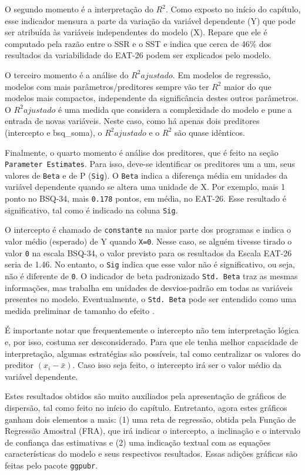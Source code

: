 \documentclass[
]{book}
\begin{document}
O segundo momento é a interpretação do \(R^2\). Como exposto no início do capítulo, esse indicador mensura a parte da variação da variável dependente (Y) que pode ser atribuída às variáveis independentes do modelo (X). Repare que ele é computado pela razão entre o SSR e o SST e indica que cerca de 46\% dos resultados da variabilidade do EAT-26 podem ser explicados pelo modelo.

O terceiro momento é a análise do \(R^2 ajustado\). Em modelos de regressão, modelos com mais parâmetros/preditores sempre vão ter \(R^2\) maior do que modelos mais compactos, independente da significância destes outros parâmetros. O \(R^2 ajustado\) é uma medida que considera a complexidade do modelo e pune a entrada de novas variáveis. Neste caso, como há apenas dois preditores (intercepto e bsq\_soma), o \(R^2 ajustado\) e o \(R^2\) são quase idênticos.

Finalmente, o quarto momento é análise dos preditores, que é feito na seção \texttt{Parameter\ Estimates}. Para isso, deve-se identificar os preditores um a um, seus valores de \texttt{Beta} e de P (\texttt{Sig}). O \texttt{Beta} indica a diferença média em unidades da variável dependente quando se altera uma unidade de X. Por exemplo, mais 1 ponto no BSQ-34, mais \texttt{0.178} pontos, em média, no EAT-26. Esse resultado é significativo, tal como é indicado na coluna \texttt{Sig}.

O intercepto é chamado de \texttt{constante} na maior parte dos programas e indica o valor médio (esperado) de Y quando \texttt{X=0}. Nesse caso, se alguém tivesse tirado o valor \texttt{0} na escala BSQ-34, o valor previsto para os resultados da Escala EAT-26 seria de 1.46. No entanto, o \texttt{Sig} indica que esse valor não é significativo, ou seja, não é diferente de \texttt{0}. O indicador de beta padronizado \texttt{Std.\ Beta} traz as mesmas informações, mas trabalha em unidades de desvios-padrão em todas as variáveis presentes no modelo. Eventualmente, o \texttt{Std.\ Beta} pode ser entendido como uma medida preliminar de tamanho do efeito \citep{fox2016}.

É importante notar que frequentemente o intercepto não tem interpretação lógica e, por isso, costuma ser desconsiderado. Para que ele tenha melhor capacidade de interpretação, algumas estratégias são possíveis, tal como centralizar os valores do preditor \((x_i-\bar{x})\). Caso isso seja feito, o intercepto irá ser o valor médio da variável dependente.

Estes resultados obtidos são muito auxiliados pela apresentação de gráficos de dispersão, tal como feito no início do capítulo. Entretanto, agora estes gráficos ganham dois elementos a mais: (1) uma reta de regressão, obtida pela Função de Regressão Amostral (FRA), que irá indicar o intercepto, a inclinação e o intervalo de confiança das estimativas e (2) uma indicação textual com as equações características do modelo e seus respectivos resultados. Essas adições gráficas são feitas pelo pacote \texttt{ggpubr}.
\end{document}
